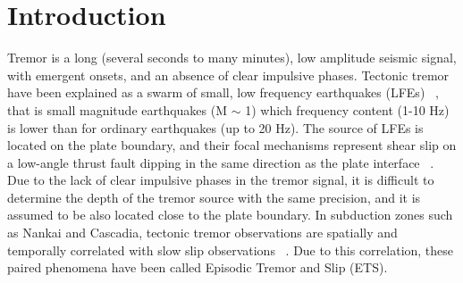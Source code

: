 \documentclass[draft]{agujournal2019}
\begin{document}

%
%
%
%


\section{Introduction}

Tremor is a long (several seconds to many minutes), low amplitude seismic signal, with emergent onsets, and an absence of clear impulsive phases. Tectonic tremor have been explained as a swarm of small, low frequency earthquakes (LFEs) ~\cite{SHE_2007_nature}, that is small magnitude earthquakes (M $\sim$ 1) which frequency content (1-10 Hz) is lower than for ordinary earthquakes (up to 20 Hz). The source of LFEs is located on the plate boundary, and their focal mechanisms represent shear slip on a low-angle thrust fault dipping in the same direction as the plate interface ~\cite{IDE_2007_GRL}. Due to the lack of clear impulsive phases in the tremor signal, it is difficult to determine the depth of the tremor source with the same precision, and it is assumed to be also located close to the plate boundary. In subduction zones such as Nankai and Cascadia, tectonic tremor observations are spatially and temporally correlated with slow slip observations ~\cite{OBA_2002, ROG_2003}. Due to this correlation, these paired phenomena have been called Episodic Tremor and Slip (ETS). \\
\end{document}
